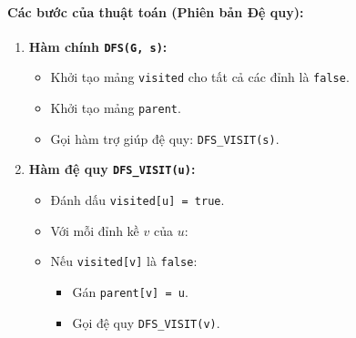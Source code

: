 \documentclass[a4paper,12pt]{article}
\begin{document}
\paragraph{Các bước của thuật toán (Phiên bản Đệ quy):}
\begin{enumerate}
    \item \textbf{Hàm chính \texttt{DFS(G, s)}:}
        \begin{itemize}
            \item Khởi tạo mảng \texttt{visited} cho tất cả các đỉnh là \texttt{false}.
            \item Khởi tạo mảng \texttt{parent}.
            \item Gọi hàm trợ giúp đệ quy: \texttt{DFS\_VISIT(s)}.
        \end{itemize}
    \item \textbf{Hàm đệ quy \texttt{DFS\_VISIT(u)}:}
        \begin{itemize}
            \item Đánh dấu \texttt{visited[u] = true}.
            \item Với mỗi đỉnh kề $v$ của $u$:
            \item Nếu \texttt{visited[v]} là \texttt{false}:
                \begin{itemize}
                    \item Gán \texttt{parent[v] = u}.
                    \item Gọi đệ quy \texttt{DFS\_VISIT(v)}.
                \end{itemize}
        \end{itemize}
\end{enumerate}
\end{document}
